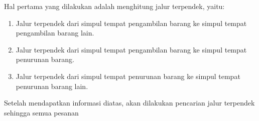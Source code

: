 Hal pertama yang dilakukan adalah menghitung jalur terpendek, yaitu:
\begin{enumerate}
    \item Jalur terpendek dari simpul tempat pengambilan barang ke simpul tempat pengambilan barang lain.
    \item Jalur terpendek dari simpul tempat pengambilan barang ke simpul tempat penurunan barang.
    \item Jalur terpendek dari simpul tempat penurunan barang ke simpul tempat penurunan barang lain.
\end{enumerate}

Setelah mendapatkan informasi diatas, akan dilakukan pencarian jalur terpendek sehingga semua pesanan 